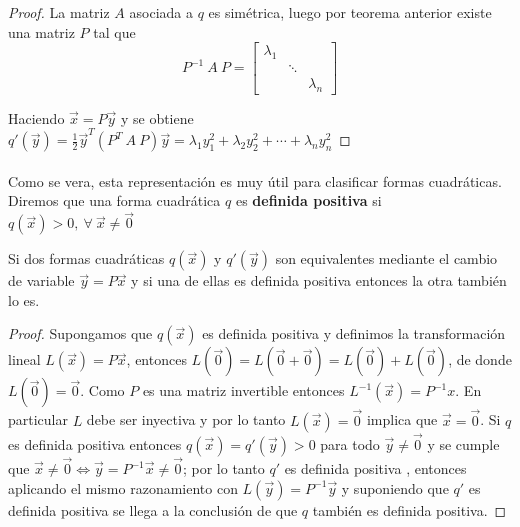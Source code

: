 \begin{proof}
La matriz $A$ asociada a $q$ es simétrica, luego por teorema anterior existe una matriz $P$ tal que 
\begin{equation*}
    P^{-1}~A~P = \begin{bmatrix}
    \lambda_{1} & &\\
    & \ddots & \\
    & & \lambda_{n}
    \end{bmatrix}
    \label{ecuacion:1.4}
\end{equation*}

Haciendo $\overrightarrow{x} = P\overrightarrow{y}$ y se obtiene $q'(\overrightarrow{y}) = \frac{1}{2}\overrightarrow{y}^{T}\left(P^{T}~A~P\right)\overrightarrow{y} = \lambda_{1}y_{1}^{2} + \lambda_{2}y_{2}^{2} + \cdots + \lambda_{n}y_{n}^{2}$

\end{proof}

\paragraph*{}
Como se vera, esta representación es muy útil para clasificar formas cuadráticas. Diremos que una forma cuadrática $q$ es \textbf{definida positiva} si $q(\overrightarrow{x}) > 0, ~\forall~ \overrightarrow{x} \neq \overrightarrow{0}$ 

\begin{lemma}
Si dos formas cuadráticas $q(\overrightarrow{x})$ y $q'(\overrightarrow{y})$ son equivalentes mediante el cambio de variable $\overrightarrow{y} = P\overrightarrow{x}$ y si una de ellas es definida positiva entonces la otra también lo es.
\label{lema:1.3}
\end{lemma}

\begin{proof}
Supongamos que $q(\overrightarrow{x})$ es definida positiva y definimos la transformación lineal $L(\overrightarrow{x}) = P\overrightarrow{x}$, entonces $L(\overrightarrow{0}) = L(\overrightarrow{0}+ \overrightarrow{0}) = L(\overrightarrow{0}) + L(\overrightarrow{0})$, de donde $L(\overrightarrow{0}) = \overrightarrow{0}$. Como $P$ es una matriz invertible entonces $L^{-1}(\overrightarrow{x}) = P^{-1}x$. En particular $L$ debe ser inyectiva y por lo tanto $L(\overrightarrow{x})=\overrightarrow{0}$ implica que $\overrightarrow{x}=\overrightarrow{0}$. Si $q$ es definida positiva entonces $q(\overrightarrow{x}) = q'(\overrightarrow{y}) > 0$ para todo $\overrightarrow{y} \neq \overrightarrow{0}$ y se cumple que $\overrightarrow{x} \neq \overrightarrow{0} \Leftrightarrow \overrightarrow{y} = P^{-1}\overrightarrow{x} \neq \overrightarrow{0}$; por lo tanto $q'$ es definida positiva , entonces aplicando el mismo razonamiento con $L(\overrightarrow{y}) = P^{-1}\overrightarrow{y}$ y suponiendo que $q'$ es definida positiva se llega a la conclusión de que $q$ también es definida positiva. 
\end{proof}

